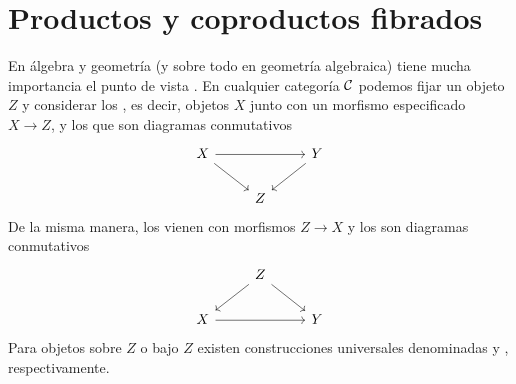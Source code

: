 \documentclass{article}
\numberwithin{equation}{section}
\theoremstyle{definition}
\begin{document}


\section{Productos y coproductos fibrados}

En álgebra y geometría (y sobre todo en geometría algebraica) tiene mucha
importancia el punto de vista . En cualquier categoría
$\mathcal{C}$ podemos fijar un objeto $Z$ y considerar los
, es decir, objetos $X$ junto con un morfismo
especificado $X \to Z$, y los  que son diagramas
conmutativos
$$\begin{tikzcd}
X\ar{rr}\ar{dr} & & Y\ar{dl} \\
& Z
\end{tikzcd}$$
De la misma manera, los  vienen con morfismos $Z \to X$ y
los  son diagramas conmutativos
$$\begin{tikzcd}
 & Z\ar{dl}\ar{dr} \\
X\ar{rr} & & Y
\end{tikzcd}$$
Para objetos sobre $Z$ o bajo $Z$ existen construcciones universales denominadas
 y , respectivamente.
\end{document}
